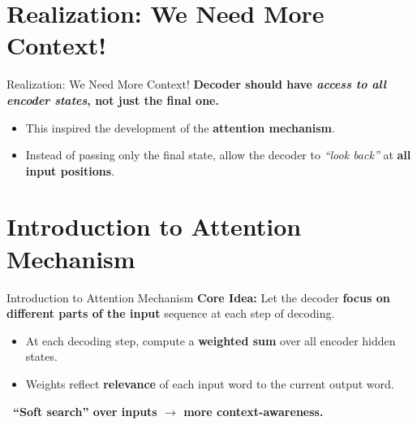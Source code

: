 \section{Realization: We Need More Context!}
\begin{frame}{Realization: We Need More Context!}
    \textbf{Decoder should have \emph{access to all encoder states}, not just the final one.}
    \begin{itemize}
        \item[\faSearch] This inspired the development of the \textbf{attention mechanism}.
        \item[\faLightbulbO] Instead of passing only the final state, allow the decoder to \emph{``look back''} at \textbf{all input positions}.
    \end{itemize}
\end{frame}


\section{Introduction to Attention Mechanism}
\begin{frame}{Introduction to Attention Mechanism}
    \textbf{Core Idea:} Let the decoder \textbf{focus on different parts of the input} sequence at each step of decoding.
    \vspace{1em}
    \begin{itemize}
        \item At each decoding step, compute a \textbf{weighted sum} over all encoder hidden states.
        \item Weights reflect \textbf{relevance} of each input word to the current output word.
    \end{itemize}
    \vspace{1em}
    \textbf{\faBrain\ ``Soft search'' over inputs $\rightarrow$ more context-awareness.}
\end{frame}


